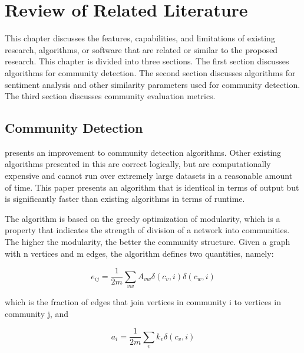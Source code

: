 %
%
%                 

\chapter{Review of Related Literature}
\label{sec:relatedlit}

This chapter discusses the features, capabilities, and limitations of existing research, algorithms, or software that are related or similar to the proposed research. This chapter is divided into three sections. The first section discusses algorithms for community detection. The second section discusses algorithms for sentiment analysis and other similarity parameters used for community detection. The third section discusses community evaluation metrics.

\section{Community Detection}

 presents an improvement to community detection algorithms. Other existing algorithms presented in this are correct logically, but are computationally expensive and cannot run over extremely large datasets in a reasonable amount of time. This paper presents an algorithm that is identical in terms of output but is significantly faster than existing algorithms in terms of runtime.

The algorithm is based on the greedy optimization of modularity, which is a property that indicates the strength of division of a network into communities. The higher the modularity, the better the community structure. Given a graph with n vertices and m edges, the algorithm defines two quantities, namely:

\begin{equation}
e_{ij} = \frac{1}{2m} \sum_{vw}{A_{vw}\delta(c_v,i)\delta(c_w,i)}
\end{equation}

which is the fraction of edges that join vertices in community i to vertices in community j, and

\begin{equation}
a_i = \frac{1}{2m} \sum_{v}{k_v\delta(c_v,i)}
\end{equation}

